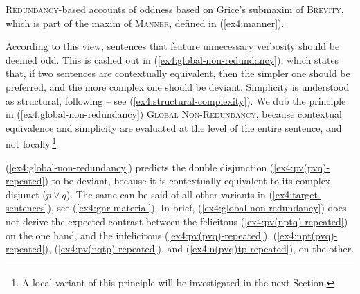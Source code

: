 \textsc{Redundancy}-based accounts of oddness based on Grice's submaxim of \textsc{Brevity}, which is part of the maxim of \textsc{Manner}, defined in (\ref{ex4:manner}).

\begin{exe}
	\label{ex4:manner}
\end{exe}

According to this view, sentences that feature unnecessary verbosity should be deemed odd. This is cashed out in (\ref{ex4:global-non-redundancy}), which states that, if two sentences are contextually equivalent, then the simpler one should be preferred, and the more complex one should be deviant. Simplicity is understood as structural, following \textcite{Katzir2007} -- see (\ref{ex4:structural-complexity}). We dub the principle in (\ref{ex4:global-non-redundancy}) \textsc{Global Non-Redundancy}, because contextual equivalence and simplicity are evaluated at the level of the entire sentence, and not locally.\footnote{A local variant of this principle will be investigated in the next Section.}

\begin{exe}
	\label{ex4:global-non-redundancy}
	\label{ex4:structural-complexity}
\end{exe}

(\ref{ex4:global-non-redundancy}) predicts the double disjunction (\ref{ex4:pv(pvq)-repeated}) to be deviant, because it is contextually equivalent to its complex disjunct ($p\vee q$). The same can be said of all other variants in (\ref{ex4:target-sentences}), see (\ref{ex4:gnr-material}). In brief, (\ref{ex4:global-non-redundancy}) does not derive the expected contrast between the felicitous (\ref{ex4:pv(nptq)-repeated}) on the one hand, and the infelicitous (\ref{ex4:pv(pvq)-repeated}), (\ref{ex4:npt(pvq)-repeated}), (\ref{ex4:pv(nqtp)-repeated}), and (\ref{ex4:n(pvq)tp-repeated}), on the other.

